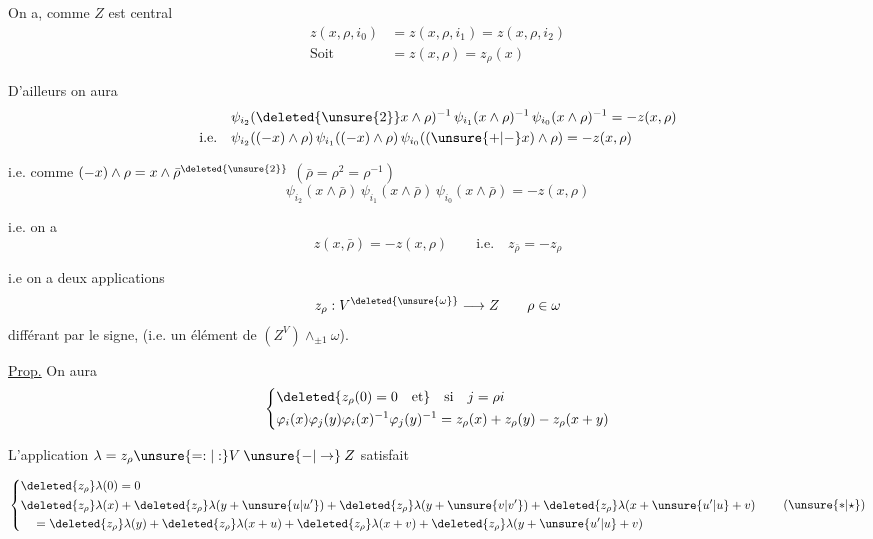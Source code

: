 
On a, comme $Z$ est central
\[
 \begin{aligned}
 z(x,\rho,i_0)&=z(x,\rho,i_1)=z(x,\rho,i_2)\\
 \text{Soit}\qquad&=z(x,\rho)=z_\rho(x)
 \end{aligned}
\]

D'ailleurs on aura
\[
 \begin{aligned}
 &\psi_{i_2}(\deleted{\unsure{2}}x\wedge\rho)^{-1}\,\psi_{i_1}(x\wedge\rho)^{-1}\,
 \psi_{i_0}(x\wedge\rho)^{-1}=-z(x,\rho)\\
 \text{i.e.}\quad&\psi_{i_2}((-x)\wedge\rho)\,\psi_{i_1}((-x)\wedge\rho)\,
 \psi_{i_0}((\unsure{+|-}x)\wedge\rho)=-z(x,\rho)
 \end{aligned}
\]

i.e.  comme $(-x)\wedge\rho=x\wedge\bar\rho^{\deleted{\unsure{2}}}$
$(\bar\rho=\rho^2=\rho^{-1})$
\[
 \psi_{i_2}(x\wedge\bar\rho)\,\psi_{i_1}(x\wedge\bar\rho)\,\psi_{i_0}(x\wedge\bar\rho)
 =-z(x,\rho)
\]

i.e. on a
\[
 z(x,\bar\rho)=-z(x,\rho)\qquad\text{i.e.}\quad z_{\bar\rho}=-z_\rho
\]

i.e on a deux applications
\[
 z_\rho:V^{\deleted{\unsure{\omega}}}\longrightarrow Z\qquad \rho\in\omega
\]
différant par le signe, (i.e. un élément de $(Z^V)\wedge_{\pm1}\omega$). 

\uline{Prop.} On aura
\[
 \left\{\begin{aligned}
 &\deleted{z_\rho(0)=0\quad\text{et}}\quad\text{si}\quad j=\rho i\\
 &\varphi_i(x)\varphi_j(y)\varphi_i(x)^{-1}\varphi_j(y)^{-1}
 =z_\rho(x)+z_\rho(y)-z_\rho(x+y)
 \end{aligned}\right.
\]

L'application $\lambda=z_\rho\unsure{=:|:}V\mathbin{\unsure{-|\to}}Z$ satisfait

\[
 \left\{\begin{aligned}
 &\deleted{z_\rho}\lambda(0)=0\\
 &\begin{aligned}
 &\deleted{z_\rho}\lambda(x)+\deleted{z_\rho}\lambda(y+\unsure{u|u'})
 +\deleted{z_\rho}\lambda(y+\unsure{v|v'})+\deleted{z_\rho}\lambda(x+\unsure{u'|u}+v)\\
 &\quad=\deleted{z_\rho}\lambda(y)+\deleted{z_\rho}\lambda(x+u)
 +\deleted{z_\rho}\lambda(x+v)+\deleted{z_\rho}\lambda(y+\unsure{u'|u}+v)
 \end{aligned}
 \end{aligned}\right. \tag*{$(\unsure{*|\star})$}
\]

